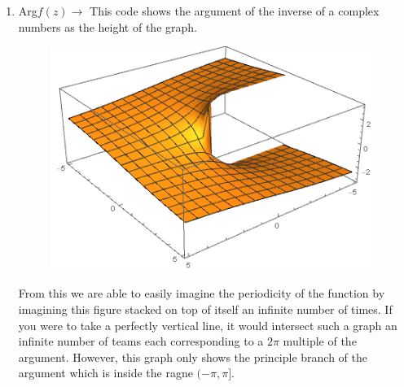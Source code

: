 \documentclass{article}
\begin{document}
\begin{enumerate}
\begin{enumerate}
		\item Arg$f(z)\rightarrow$
		This code shows the argument of the inverse of a complex numbers as the height of the graph.
			\begin{figure}[H]
			\includegraphics[scale=0.8]{image4.png}
			\end{figure}
		From this we are able to easily imagine the periodicity of the function by imagining this figure stacked on top of itself an infinite number of times. If you were to take a perfectly vertical line, it would intersect such a graph an infinite number of teams each corresponding to a $2\pi$ multiple of the argument. However, this graph only shows the principle branch of the argument which is inside the ragne $(-\pi,\pi]$.
	\end{enumerate}
	

\end{enumerate}
\end{document}
